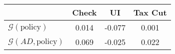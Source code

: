 \begin{tabular}{@{}lccc@{}} 
\toprule 
                          & Check      & UI    & Tax Cut    \\  \midrule 
$\mathcal{G}(\text{policy})$ & 0.014  & -0.077  & 0.001     \\ 
$\mathcal{G}(AD,\text{policy})$ & 0.069  & -0.025  & 0.022     \\ 
\end{tabular}  
